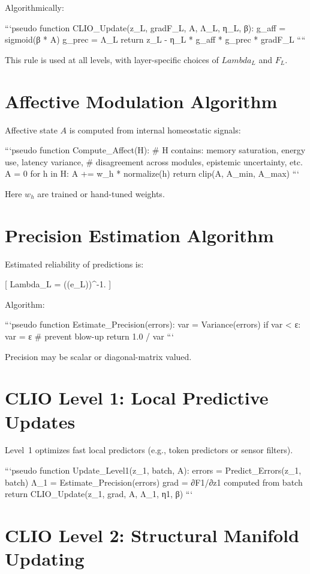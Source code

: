 \documentclass[12pt,oneside]{book}
\theoremstyle{plain}
\theoremstyle{definition}
\def\Lambda{Lambda}%
\begin{document}
Algorithmically:

```pseudo
function CLIO_Update(z_L, gradF_L, A, Λ_L, η_L, β):
    g_aff  = sigmoid(β * A)
    g_prec = Λ_L
    return z_L - η_L * g_aff * g_prec * gradF_L
````

This rule is used at all levels, with layer-specific choices of $\Lambda_L$
and $F_L$.

\section{Affective Modulation Algorithm}

Affective state $A$ is computed from internal homeostatic signals:

```pseudo
function Compute_Affect(H):
    # H contains: memory saturation, energy use, latency variance,
    # disagreement across modules, epistemic uncertainty, etc.
    A  = 0
    for h in H:
        A += w_h * normalize(h)
    return clip(A, A_min, A_max)
```

Here $w_h$ are trained or hand-tuned weights.

\section{Precision Estimation Algorithm}

Estimated reliability of predictions is:

[
\Lambda_L = \left((e_L)\right)^{-1}.
]

Algorithm:

```pseudo
function Estimate_Precision(errors):
    var = Variance(errors)
    if var < ε:
        var = ε     # prevent blow-up
    return 1.0 / var
```

Precision may be scalar or diagonal-matrix valued.

\section{CLIO Level 1: Local Predictive Updates}

Level~1 optimizes fast local predictors (e.g., token predictors or sensor filters).

```pseudo
function Update_Level1(z_1, batch, A):
    errors = Predict_Errors(z_1, batch)
    Λ_1    = Estimate_Precision(errors)
    grad   = ∂F1/∂z1 computed from batch
    return CLIO_Update(z_1, grad, A, Λ_1, η1, β)
```

\section{CLIO Level 2: Structural Manifold Updating}
\end{document}
